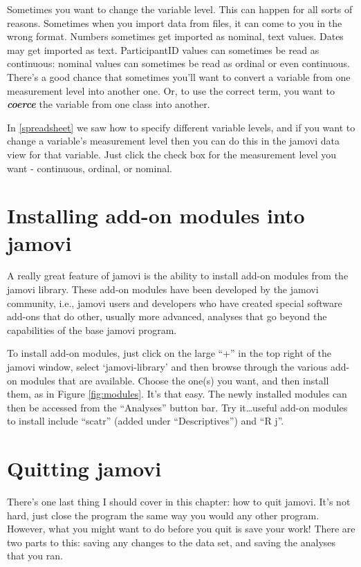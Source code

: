 \documentclass[
]{book}
\begin{document}
Sometimes you want to change the variable level. This can happen for all sorts of reasons. Sometimes when you import data from files, it can come to you in the wrong format. Numbers sometimes get imported as nominal, text values. Dates may get imported as text. ParticipantID values can sometimes be read as continuous: nominal values can sometimes be read as ordinal or even continuous. There's a good chance that sometimes you'll want to convert a variable from one measurement level into another one. Or, to use the correct term, you want to \textbf{\emph{coerce}} the variable from one class into another.

In \ref{spreadsheet} we saw how to specify different variable levels, and if you want to change a variable's measurement level then you can do this in the jamovi data view for that variable. Just click the check box for the measurement level you want - continuous, ordinal, or nominal.

\hypertarget{jamovimodules}{%
\section{Installing add-on modules into jamovi}\label{jamovimodules}}

A really great feature of jamovi is the ability to install add-on modules from the jamovi library. These add-on modules have been developed by the jamovi community, i.e., jamovi users and developers who have created special software add-ons that do other, usually more advanced, analyses that go beyond the capabilities of the base jamovi program.

To install add-on modules, just click on the large ``+'' in the top right of the jamovi window, select `jamovi-library' and then browse through the various add-on modules that are available. Choose the one(s) you want, and then install them, as in Figure \ref{fig:modules}. It's that easy. The newly installed modules can then be accessed from the ``Analyses'' button bar. Try it\ldots useful add-on modules to install include ``scatr'' (added under ``Descriptives'') and ``R j''.

\hypertarget{quittingjamovi}{%
\section{Quitting jamovi}\label{quittingjamovi}}

There's one last thing I should cover in this chapter: how to quit jamovi. It's not hard, just close the program the same way you would any other program. However, what you might want to do before you quit is save your work! There are two parts to this: saving any changes to the data set, and saving the analyses that you ran.
\end{document}
